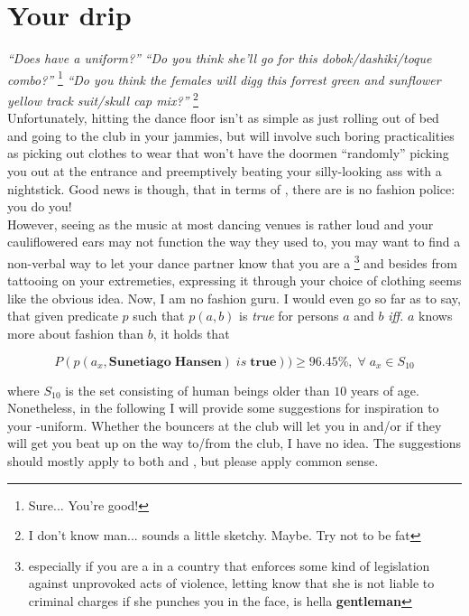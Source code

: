 \chapter*{Your \sectionsovs drip}
\textit{``Does \sovs have a uniform?''} \textit{``Do you think she'll go for this \textit{dobok}/\textit{dashiki}/\textit{toque} combo?''} \footnote{Sure... You're good!} \textit{``Do you think the females will digg this forrest green and sunflower yellow track suit/skull cap mix?''} \footnote{I don't know man... sounds a little sketchy. Maybe. Try not to be fat}\\
Unfortunately, hitting the dance floor isn't as simple as just rolling out of bed and going to the club in your jammies, but will involve such boring practicalities as picking out clothes to wear that won't have the doormen ``randomly'' picking you out at the entrance and preemptively beating your silly-looking ass with a nightstick. Good news is though, that in terms of \sovs, there are is no fashion police: you do you!\\
However, seeing as the music at most dancing venues is rather loud and your cauliflowered ears may not function the way they used to, you may want to find a non-verbal way to let your dance partner know that you are a \sovseneer \footnote{especially if you are a \dude in a country that enforces some kind of legislation against unprovoked acts of violence, letting \gal know that she is not liable to criminal charges if she punches you in the face, is hella \textbf{gentleman}}  and besides from tattooing \sovs on your extremeties, expressing it through your choice of clothing seems like the obvious idea. Now, I am no fashion guru. I would even go so far as to say, that given predicate $p$ such that $p(a,b)$ is \textit{true} for persons $a$ and $b$ \textit{iff.} $a$ knows more about fashion than $b$, it holds that 

\begin{equation*}
P(p(a_x, \pmb{Sunetiago} \; \pmb{Hansen}) \; is \; \pmb{true})) \geq 96.45\%, \; \forall \; a_x  \in  S_{10} 
\end{equation*}

where $S_{10}$ is the set consisting of human beings older than $10$ years of age.\\
Nonetheless, in the following I will provide some suggestions for inspiration to your \sovs-uniform. Whether the bouncers at the club will let you in and/or if they will get you beat up on the way to/from the club, I have no idea. The suggestions should mostly apply to both \dude and \gal, but please apply common sense. 

